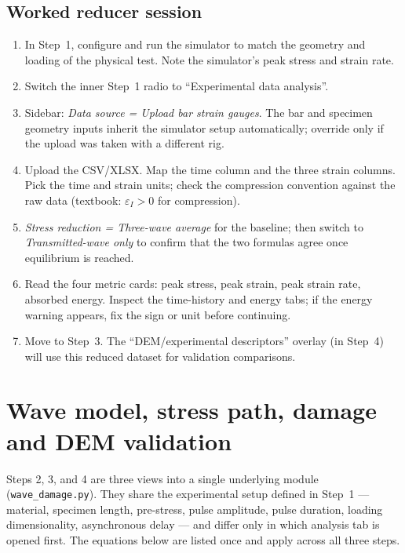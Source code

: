 \documentclass[11pt,a4paper,openany]{book}
\theoremstyle{handbook}
\newcommand{\eps}{\varepsilon}
\begin{document}
\section{Worked reducer session}

\begin{stepbox}
\begin{enumerate}[leftmargin=*,itemsep=3pt]
  \item In Step~1, configure and run the simulator to match the geometry
        and loading of the physical test. Note the simulator's peak
        stress and strain rate.
  \item Switch the inner Step~1 radio to ``Experimental data analysis''.
  \item Sidebar: \emph{Data source = Upload bar strain gauges}. The bar
        and specimen geometry inputs inherit the simulator setup
        automatically; override only if the upload was taken with a
        different rig.
  \item Upload the CSV/XLSX. Map the time column and the three strain
        columns. Pick the time and strain units; check the compression
        convention against the raw data (textbook: $\eps_I>0$ for
        compression).
  \item \emph{Stress reduction = Three-wave average} for the baseline;
        then switch to \emph{Transmitted-wave only} to confirm that the
        two formulas agree once equilibrium is reached.
  \item Read the four metric cards: peak stress, peak strain, peak strain
        rate, absorbed energy. Inspect the time-history and energy tabs;
        if the energy warning appears, fix the sign or unit before
        continuing.
  \item Move to Step~3. The ``DEM/experimental descriptors'' overlay (in
        Step~4) will use this reduced dataset for validation comparisons.
\end{enumerate}
\end{stepbox}

\chapter{Wave model, stress path, damage and DEM validation}\label{ch:wavedamage}

Steps 2, 3, and 4 are three views into a single underlying module
(\texttt{wave\_damage.py}). They share the experimental setup defined in
Step~1 --- material, specimen length, pre-stress, pulse amplitude, pulse
duration, loading dimensionality, asynchronous delay --- and differ only
in which analysis tab is opened first. The equations below are listed once
and apply across all three steps.
\end{document}
